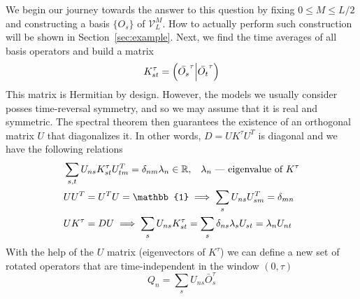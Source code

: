 We begin our journey towards the answer to this question by fixing \(0\leq M \leq L/2\) and constructing a basis \(\{O_s\}\) of \(\mathcal{V}_L^M\). How to actually perform such construction
will be shown in Section~\ref{sec:example}. Next, we find the time averages of all basis operators and build a matrix
\begin{equation}
  K^{\tau}_{st} = \left(\bar{O_s}^{\tau} \middle| \bar{O_t}^{\tau}\right)
  \label{eq:stiffness matrix}
\end{equation}
This matrix is Hermitian by design. However, the models we usually
consider posses time-reversal symmetry, and so we may assume that it is real and symmetric.
The spectral theorem then guarantees the existence of an orthogonal matrix \(U\) that
diagonalizes it. In other words, \(D = UK^{\tau}U^{T}\) is diagonal and we have the following relations
\begin{align}
  &\sum_{s, t} U_{n s} K_{s t}^{\tau} U_{t m}^{T}=\delta_{nm} \lambda_{n} \in
   \RR,\;\;\; \lambda_n \text{ --- eigenvalue of }K^{\tau} \label{eq:property diag} \\
  &UU^{T} = U^{T}U = \mathbb{1} \implies \sum_{s} U_{ns}U_{sm}^{T} =
   \delta_{mn} \label{eq:propery ortho}\\
  & U K^{\tau} = D U \implies \sum_s U_{ns} K_{st}^{\tau} = \sum_s  \delta_{ns} \lambda_s U_{st} = \lambda_n U_{nt}\label{eq:property}
\end{align} 
With the help of the \(U\) matrix (eigenvectors of \(K^{\tau}\)) we can define a new set of rotated operators that
are time-independent in the window \(\left(0,\tau\right)\)
\begin{equation}
  Q_n = \sum_s U_{ns}\bar{O}_{s}^{\tau}\label{eq:new operators}
\end{equation} 


